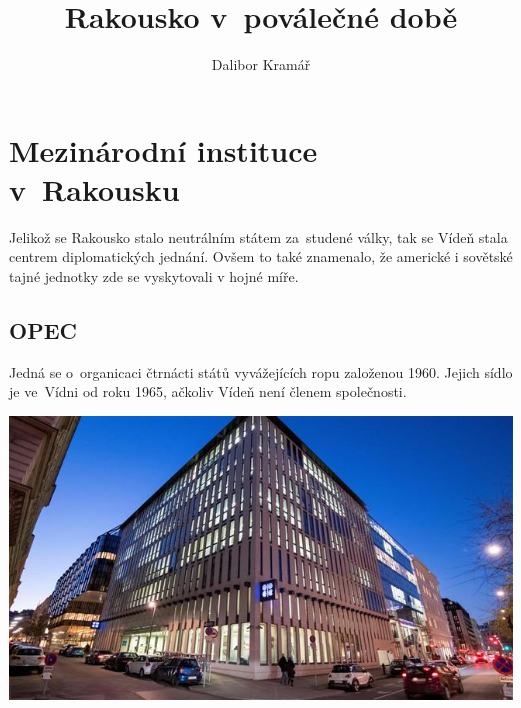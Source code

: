 \documentclass[a2 paper]{article}
\title{Rakousko v~poválečné době}
\author{Dalibor Kramář}
\makeatletter
\let\thetitle\@title
\makeatother
\begin{document}
\pagestyle{empty}
\begin{landscape}
\begin{center}
	{\fontsize{1cm}{1cm} \selectfont \textbf{\thetitle}}
\end{center}
\begin{minipage}[c]{\linewidth}
\centering
\begin{minipage}[t]{0.2\linewidth}
	\section*{Mezinárodní instituce\\ v~Rakousku}
	Jelikož se Rakousko stalo neutrálním státem za~studené války, tak se Vídeň stala centrem diplomatických jednání. Ovšem to také znamenalo, že americké i sovětské tajné jednotky zde se vyskytovali v hojné míře.
	\subsection*{OPEC}
	Jedná se o~organicaci čtrnácti států vyvážejících ropu založenou 1960. Jejich sídlo je ve~Vídni od roku 1965, ačkoliv Vídeň není členem společnosti.
	\begin{minipage}[t]{\linewidth}
		\includegraphics[width=\linewidth]{images/opec.jpg}
	\end{minipage}

\end{minipage}
\end{minipage}
\end{landscape}
\end{document}
